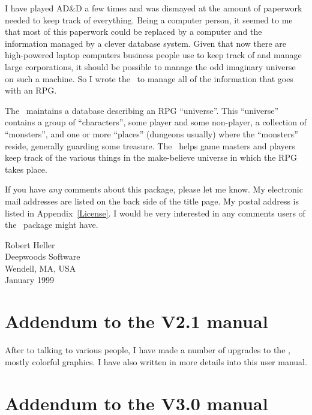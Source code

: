 I have played AD\&D a few times and was dismayed at the amount of paperwork needed to keep track of everything.  Being a computer person, it
seemed to me that most of this paperwork could be replaced by a
computer and the information managed by a clever database system.  Given
that now there are high-powered laptop computers business people use
to keep track of and manage large corporations, it should be possible to
manage the odd imaginary universe on such a machine.  So I wrote
the \thesystem\ to manage all of the information that goes with an RPG.

The \thesystem\ maintains a database describing an RPG ``universe''.  
This ``universe'' contains a group of ``characters'', some player and
some non-player, a collection of ``monsters'', and one or more
``places'' (dungeons usually) where the ``monsters'' reside, generally
guarding some treasure.  The \thesystem\ helps game masters and players
keep track of the various things in the make-believe universe in
which the RPG takes place.

If you have {\em any} comments about this package, please let me know.
My electronic mail addresses are listed on the back side of the title
page.  My postal address is listed in Appendix~\ref{License}.  I would be
very interested in any comments users of the \thesystem\ package might
have.

\vspace{.25in}
\noindent
Robert Heller \\
Deepwoods Software \\
Wendell, MA, USA \\
January 1999

\section*{Addendum to the V2.1 manual}
%

After to talking to various people, I have made a number of upgrades to
the \thesystem, mostly colorful graphics.  I have also written in more
details into this user manual.

\section*{Addendum to the V3.0 manual}
%


